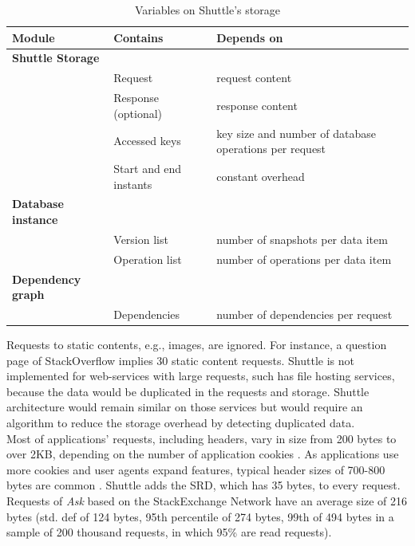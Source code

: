 \begin{table}[ht]
\centering
\begin{tabular}{l|ll}
\textbf{Module}          & \textbf{Contains}      & \textbf{Depends on}    \\ \hline
\textbf{Shuttle Storage} &                        &                          \\
                         & Request                & request content          \\
                         & Response (optional)    & response content         \\
                         & Accessed keys          & key size and number of database operations per request\\
                         & Start and end instants & constant overhead           \\ \hline
\textbf{Database instance} &                      &                          \\
                          & Version list          & number of snapshots per data item \\
                          & Operation list        & number of operations per data item \\ \hline
\textbf{Dependency graph} &                       &                                   \\
                        & Dependencies            & number of dependencies per request\\
\end{tabular}
\caption{Variables on Shuttle's storage}
\label{tab:storage_variables}
\end{table}

Requests to static contents, e.g., images, are ignored. For instance, a question page of StackOverflow \cite{stackoverflow} implies 30 static content requests. Shuttle is not implemented for web-services with large requests, such has file hosting services, because the data would be duplicated in the requests and storage. Shuttle architecture would remain similar on those services but would require an algorithm to reduce the storage overhead by detecting duplicated data.\\

Most of applications' requests, including headers, vary in size from 200 bytes to over 2KB, depending on the number of application cookies \cite{spdy}. As applications use more cookies and user agents expand features, typical header sizes of 700-800 bytes are common \cite{spdy}. Shuttle adds the \ac{SRD}, which has 35 bytes, to every request. Requests of \emph{Ask} based on the StackExchange Network have an average size of 216 bytes (std. def of 124 bytes, 95th percentile of 274 bytes,  99th of 494 bytes in a sample of 200 thousand requests, in which 95\% are read requests).

